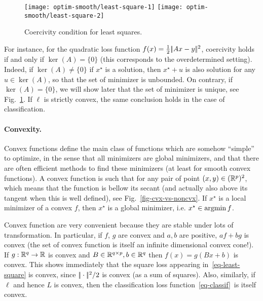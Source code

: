 \begin{figure}
\centering
\texttt{[image: optim-smooth/least-square-1]} \quad
\texttt{[image: optim-smooth/least-square-2]} 
\caption{\label{fig-least-square}
Coercivity condition for least squares.
}
\end{figure}

\begin{exmp}
For instance, for the quadratic loss function $f(x)=\frac{1}{2}|\!| Ax-y |\!|^2$, coercivity holds if and only if $\ker(A)=\{0\}$ (this corresponds to the overdetermined setting). Indeed, if $\ker(A) \neq \{0\}$ if $x^\star$ is a solution, then $x^\star+u$ is also solution for any $u \in \ker(A)$, so that the set of minimizer is unbounded.
%
On contrary, if $\ker(A) = \{0\}$, we will show later that the set of minimizer is unique, see Fig.~\ref{fig-least-square}. 
%
If $\ell$ is strictly convex, the same conclusion holds in the case of classification.
\end{exmp}

\paragraph{Convexity.}

Convex functions define the main class of functions which are somehow ``simple'' to optimize, in the sense that all minimizers are global minimizers, and that there are often efficient methods to find these minimizers (at least for smooth convex functions). A convex function is such that for any pair of point $(x,y) \in (\mathbb{R}^p)^2$, 
which means that the function is bellow its secant (and actually also above its tangent when this is well defined), see Fig.~\ref{fig-cvx-vs-noncvx}. 
%
If $x^\star$ is a local minimizer of a convex $f$, then $x^\star$ is a global minimizer, i.e. $x^\star \in \operatorname{argmin} f$.  



Convex function are very convenient because they are stable under lots of transformation. In particular, if $f$, $g$ are convex and $a, b$ are positive, $a f + b g$ is convex (the set of convex function is itself an infinite dimensional convex cone!). If $g : \mathbb{R}^q \rightarrow \mathbb{R}$ is convex and $B \in \mathbb{R}^{q \times p}, b \in \mathbb{R}^q$ then $f(x) = g(B x+b)$ is convex. 
%
This shows immediately that the square loss appearing in~\eqref{eq-least-square} is convex, since $|\!| \cdot |\!|^2/2$ is convex (as a sum of squares). 
%
Also, similarly, if $\ell$ and hence $L$ is convex, then the classification loss function~\eqref{eq-classif} is itself convex. 

